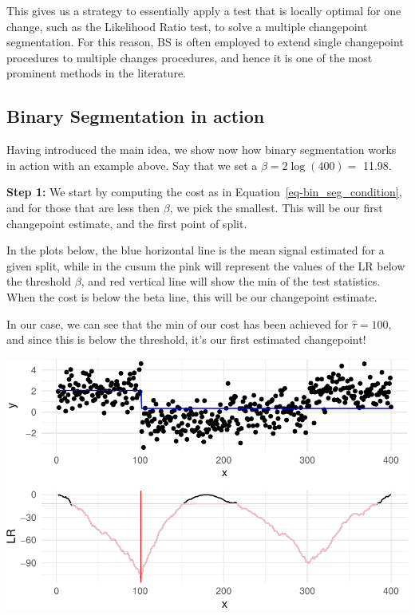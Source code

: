 \documentclass[
  letterpaper,
  DIV=11,
  numbers=noendperiod]{scrreprt}
\begin{document}
This gives us a strategy to essentially apply a test that is locally
optimal for one change, such as the Likelihood Ratio test, to solve a
multiple changepoint segmentation. For this reason, BS is often employed
to extend single changepoint procedures to multiple changes procedures,
and hence it is one of the most prominent methods in the literature.

\subsection{Binary Segmentation in
action}\label{binary-segmentation-in-action}

Having introduced the main idea, we show now how binary segmentation
works in action with an example above. Say that we set a
\(\beta = 2 \log(400) =\) 11.98.

\textbf{Step 1:} We start by computing the cost as in
Equation~\ref{eq-bin_seg_condition}, and for those that are less then
\(\beta\), we pick the smallest. This will be our first changepoint
estimate, and the first point of split.

In the plots below, the blue horizontal line is the mean signal
estimated for a given split, while in the cusum the pink will represent
the values of the LR below the threshold \(\beta\), and red vertical
line will show the min of the test statistics. When the cost is below
the beta line, this will be our changepoint estimate.

In our case, we can see that the min of our cost has been achieved for
\(\hat\tau=100\), and since this is below the threshold, it's our first
estimated changepoint!

\includegraphics{3_multiple_changes_files/figure-pdf/unnamed-chunk-8-1.pdf}
\end{document}
